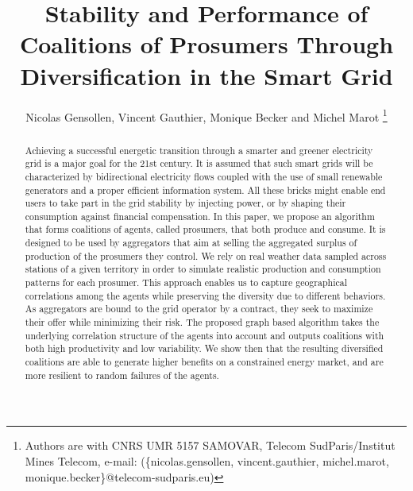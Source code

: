 \documentclass[journal]{IEEEtran}
\begin{document}

%
%
\title{Stability and Performance of Coalitions of Prosumers Through Diversification in the Smart Grid}

%
%
\author{Nicolas Gensollen, Vincent Gauthier, Monique Becker and Michel Marot
\thanks{Authors are with CNRS UMR 5157 SAMOVAR, Telecom SudParis/Institut Mines Telecom, e-mail: (\{nicolas.gensollen, vincent.gauthier, michel.marot, monique.becker\}@telecom-sudparis.eu)}}%


\maketitle

%
%
\begin{abstract}
Achieving a successful energetic transition through a smarter and greener electricity grid is a major goal for the 21st century. It is assumed that such smart grids will be characterized by bidirectional electricity flows coupled with the use of small renewable generators and a proper efficient information system. All these bricks might enable end users to take part in the grid stability by injecting power, or by shaping their consumption against financial compensation. In this paper, we propose an algorithm that forms coalitions of agents, called prosumers, that both produce and consume. It is designed to be used by aggregators that aim at selling the aggregated surplus of production of the prosumers they control. We rely on real weather data sampled across stations of a given territory in order to simulate realistic production and consumption patterns for each prosumer. This approach enables us to capture geographical correlations among the agents while preserving the diversity due to different behaviors. As aggregators are bound to the grid operator by a contract, they seek to maximize their offer while minimizing their risk. The proposed graph based algorithm takes the underlying correlation structure of the agents into account and outputs coalitions with both high productivity and low variability. We show then that the resulting diversified coalitions are able to generate higher benefits on a constrained energy market, and are more resilient to random failures of the agents.
\end{abstract}
\end{document}
